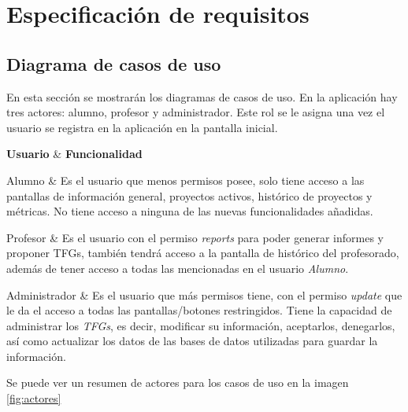 \section{Especificación de requisitos}

\subsection{Diagrama de casos de uso}
En esta sección se mostrarán los diagramas de casos de uso. En la aplicación hay tres actores: alumno, profesor y administrador.
Este rol se le asigna una vez el usuario se registra en la aplicación en la pantalla inicial. 


{\textbf{Usuario} & \textbf{Funcionalidad} \\}{
	Alumno & Es el usuario que menos permisos posee, solo tiene acceso a las pantallas de información general, proyectos activos, histórico de proyectos y métricas. No tiene acceso a ninguna de las nuevas funcionalidades añadidas. \\\hline
	
	Profesor & Es el usuario con el permiso \emph{reports} para poder generar informes y proponer TFGs, también tendrá acceso a la pantalla de histórico del profesorado, además de tener acceso a todas las mencionadas en el usuario \emph{Alumno}. \\\hline
	
	Administrador & Es el usuario que más permisos tiene, con el permiso \emph{update} que le da el acceso a todas las pantallas/botones restringidos. Tiene la capacidad de administrar los \emph{TFGs}, es decir, modificar su información, aceptarlos, denegarlos, así como actualizar los datos de las bases de datos utilizadas para guardar la información. \\
}
Se puede ver un resumen de actores para los casos de uso en la imagen \ref{fig:actores}

